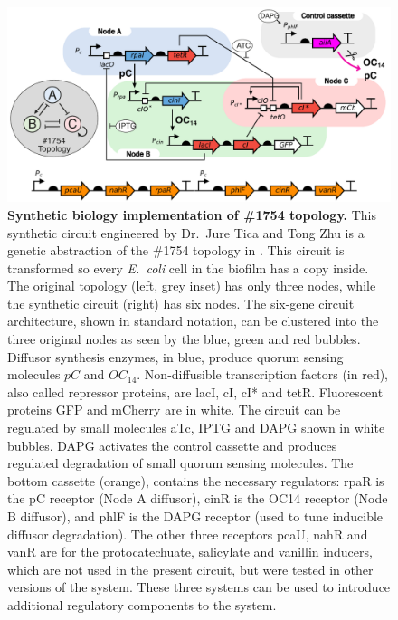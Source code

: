 \begin{figure}[H]
    \centering
    \includegraphics[width=1\textwidth]{chapters/Chapter 2/synthetic circuit2}
    \caption{\textbf{Synthetic biology implementation of \#1754 topology.} This synthetic circuit
    engineered by Dr.~Jure Tica and Tong Zhu is a genetic abstraction of the \#1754 topology in \cite{Scholes2019}.
    This circuit is transformed so every \textit{E.~coli} cell in the biofilm has a copy inside.
    The original topology (left, grey inset) has only three nodes, while the synthetic circuit (right) has six nodes.
    The six-gene circuit architecture, shown in standard notation, can be clustered into the three original nodes
    as seen by the blue, green and red bubbles.
    Diffusor synthesis enzymes, in blue, produce quorum sensing molecules $pC$ and $OC_{14}$.
    Non-diffusible transcription
    factors (in red), also called repressor proteins, are lacI, cI, cI* and tetR.
    Fluorescent proteins GFP and mCherry are in white.
    The circuit can be regulated by small molecules aTc, IPTG and DAPG shown in white bubbles.
    DAPG activates the control cassette and produces regulated degradation of small quorum sensing molecules.
    The bottom cassette (orange), contains the necessary regulators:
    rpaR is the pC receptor (Node A diffusor), cinR is the OC14 receptor (Node B diffusor),
        and phlF is the DAPG receptor (used to tune inducible diffusor degradation).
    The other three receptors pcaU, nahR and vanR are for the protocatechuate, salicylate and vanillin inducers,
        which are not used in the present circuit, but were tested in other versions of the system.
    These three systems can be used to introduce additional regulatory components to the system.}
    \label{fig:synthetic circuit_chapter2}
\end{figure}


